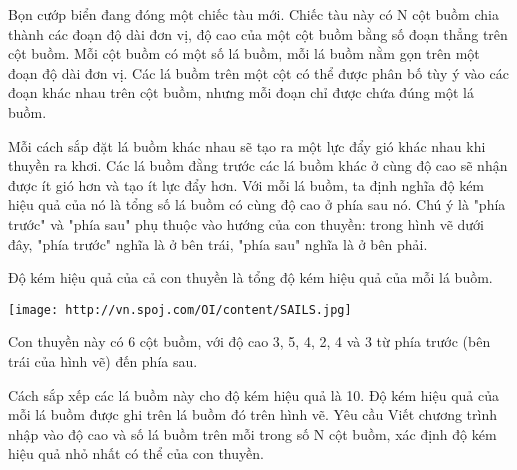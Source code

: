 Bọn cướp biển đang đóng một chiếc tàu mới. Chiếc tàu này có N cột buồm chia thành các đoạn độ dài đơn vị, độ cao của một cột buồm bằng số đoạn thẳng trên cột buồm. Mỗi cột buồm có một số lá buồm, mỗi lá buồm nằm gọn trên một đoạn độ dài đơn vị. Các lá buồm trên một cột có thể được phân bố tùy ý vào các đoạn khác nhau trên cột buồm, nhưng mỗi đoạn chỉ được chứa đúng một lá buồm.  

   Mỗi cách sắp đặt lá buồm khác nhau sẽ tạo ra một lực đẩy gió khác nhau khi thuyền ra khơi. Các lá buồm đằng trước các lá buồm khác ở cùng độ cao sẽ nhận được ít gió hơn và tạo ít lực đẩy hơn. Với mỗi lá buồm, ta định nghĩa độ kém hiệu quả của nó là tổng số lá buồm có cùng độ cao ở phía sau nó. Chú ý là "phía trước" và "phía sau" phụ thuộc vào hướng của con thuyền: trong hình vẽ dưới đây, "phía trước" nghĩa là ở bên trái, "phía sau" nghĩa là ở bên phải.  

   Độ kém hiệu quả của cả con thuyền là tổng độ kém hiệu quả của mỗi lá buồm.  


\texttt{[image: http://vn.spoj.com/OI/content/SAILS.jpg]}

   Con thuyền này có 6 cột buồm, với độ cao 3, 5, 4, 2, 4 và 3 từ phía trước (bên trái của hình vẽ) đến phía sau.  

   Cách sắp xếp các lá buồm này cho độ kém hiệu quả là 10. Độ kém hiệu quả của mỗi lá buồm được ghi trên lá buồm đó trên hình vẽ.
   Yêu cầu  
Viết chương trình nhập vào độ cao và số lá buồm trên mỗi trong số N cột buồm, xác định độ kém hiệu quả nhỏ nhất có thể của con thuyền.